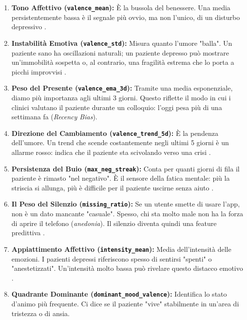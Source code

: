 \begin{enumerate}
    \item \textbf{Tono Affettivo (\texttt{valence\_mean}):} È la bussola del benessere. Una media persistentemente bassa è il segnale più ovvio, ma non l'unico, di un disturbo depressivo \cite{kuppens2010inertia}.

    \item \textbf{Instabilità Emotiva (\texttt{valence\_std}):} Misura quanto l'umore "balla". Un paziente sano ha oscillazioni naturali; un paziente depresso può mostrare un'immobilità sospetta o, al contrario, una fragilità estrema che lo porta a picchi improvvisi \cite{houben2015emotion}.

    \item \textbf{Peso del Presente (\texttt{valence\_ema\_3d}):} Tramite una media esponenziale, diamo più importanza agli ultimi 3 giorni. Questo riflette il modo in cui i clinici valutano il paziente durante un colloquio: l'oggi pesa più di una settimana fa (\textit{Recency Bias}).

    \item \textbf{Direzione del Cambiamento (\texttt{valence\_trend\_5d}):} È la pendenza dell'umore. Un trend che scende costantemente negli ultimi 5 giorni è un allarme rosso: indica che il paziente sta scivolando verso una crisi \cite{wichers2016critical}.

    \item \textbf{Persistenza del Buio (\texttt{max\_neg\_streak}):} Conta per quanti giorni di fila il paziente è rimasto "nel negativo". È il sensore della fatica mentale: più la striscia si allunga, più è difficile per il paziente uscirne senza aiuto \cite{aanhetrot2012ema}.

    \item \textbf{Il Peso del Silenzio (\texttt{missing\_ratio}):} Se un utente smette di usare l'app, non è un dato mancante "casuale". Spesso, chi sta molto male non ha la forza di aprire il telefono (\textit{anedonia}). Il silenzio diventa quindi una feature predittiva \cite{mohr2017personal}.
    
    \item \textbf{Appiattimento Affettivo (\texttt{intensity\_mean}):} Media dell'intensità delle emozioni. I pazienti depressi riferiscono spesso di sentirsi "spenti" o "anestetizzati". Un'intensità molto bassa può rivelare questo distacco emotivo \cite{rottenberg2005mood}.

    \item \textbf{Quadrante Dominante (\texttt{dominant\_mood\_valence}):} Identifica lo stato d'animo più frequente. Ci dice se il paziente "vive" stabilmente in un'area di tristezza o di ansia.
\end{enumerate}

